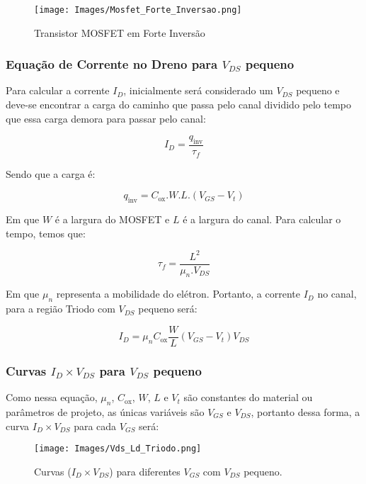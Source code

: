 \documentclass[12pt]{article}
\begin{document}
\begin{figure}[H]
  \begin{center}
    \texttt{[image: Images/Mosfet\_Forte\_Inversao.png]}
  \end{center}
  \caption{Transistor MOSFET em Forte Inversão}
\end{figure}

\subsubsection{Equação de Corrente no Dreno para $V_{DS}$ pequeno}

Para calcular a corrente $I_D$, inicialmente será considerado um $V_{DS}$ pequeno e deve-se encontrar a carga do caminho que passa pelo canal dividido pelo tempo que essa carga demora para passar pelo canal:

$$
  I_D = \frac{q_{\text{inv}}}{\tau_f}
$$

Sendo que a carga é:

$$
  q_{\text{inv}} = C_{\text{ox}} . W . L . (V_{GS} - V_t)
$$

Em que $W$ é a largura do MOSFET e $L$ é a largura do canal. Para calcular o tempo, temos que:

$$
  \tau_f = \frac{L^2}{\mu_n . V_{DS}}
$$

Em que $\mu_n$ representa a mobilidade do elétron. Portanto, a corrente $I_D$ no canal, para a região Triodo com $V_{DS}$ pequeno será:

$$
  I_D = \mu_n C_{\text{ox}} \frac{W}{L} (V_{GS} - V_t) V_{DS}
$$

\subsubsection{Curvas $I_D \times V_{DS}$ para $V_{DS}$ pequeno}

Como nessa equação, $\mu_n$, $C_{\text{ox}}$, $W$, $L$ e $V_t$ são constantes do material ou parâmetros de projeto, as únicas variáveis são $V_{GS}$ e $V_{DS}$, portanto dessa forma, a curva $I_D \times V_{DS}$ para cada $V_{GS}$ será:

\begin{figure}[H]
  \begin{center}
    \texttt{[image: Images/Vds\_Ld\_Triodo.png]}
  \end{center}
  \caption{Curvas ($I_D \times V_{DS}$) para diferentes $V_{GS}$ com $V_{DS}$ pequeno.}
\end{figure}
\end{document}
